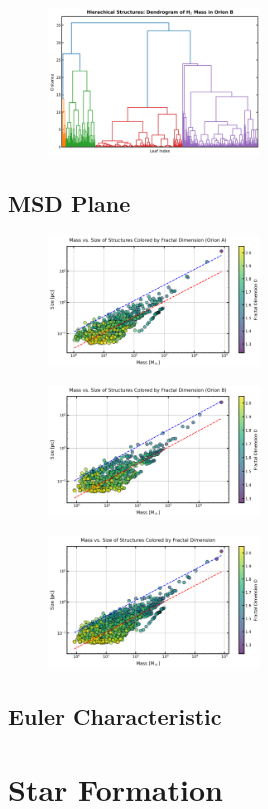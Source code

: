 \begin{figure}[t]
    \centering
    \includegraphics[width=0.5\textwidth]{figures/dendogram_B.png}
    \caption{}
    \label{fig:dendrogram_B}
\end{figure}

\subsection{MSD Plane}

\begin{figure}[t]
    \centering
    \includegraphics[width=0.5\textwidth]{figures/MSD_Orion_A.png}
    \caption{}
    \label{fig:MSD_orion_A}
\end{figure}

\begin{figure}[t]
    \centering
    \includegraphics[width=0.5\textwidth]{figures/MSD_Orion_B.png}
    \caption{}
    \label{fig:MSD_orion_B}
\end{figure}

\begin{figure}[t]
    \centering
    \includegraphics[width=0.5\textwidth]{figures/MSD_Orion_A_B.png}
    \caption{}
    \label{fig:MSD_orion_A_B}
\end{figure}

\subsection{Euler Characteristic}

\section{Star Formation}

